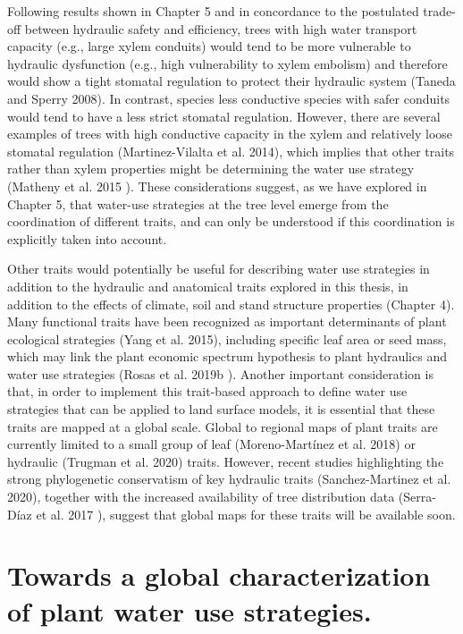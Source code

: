 \documentclass[11pt,twoside]{reedthesis}
\begin{document}
Following results shown in Chapter 5 and in concordance to the
postulated trade-off between hydraulic safety and efficiency, trees with
high water transport capacity (e.g., large xylem conduits) would tend to
be more vulnerable to hydraulic dysfunction (e.g., high vulnerability to
xylem embolism) and therefore would show a tight stomatal regulation to
protect their hydraulic system (Taneda and Sperry 2008). In contrast,
species less conductive species with safer conduits would tend to have a
less strict stomatal regulation. However, there are several examples of
trees with high conductive capacity in the xylem and relatively loose
stomatal regulation (Martinez-Vilalta et al. 2014), which implies that
other traits rather than xylem properties might be determining the water
use strategy (Matheny et al. 2015 ). These considerations suggest, as we
have explored in Chapter 5, that water-use strategies at the tree level
emerge from the coordination of different traits, and can only be
understood if this coordination is explicitly taken into account.\par

Other traits would potentially be useful for describing water use
strategies in addition to the hydraulic and anatomical traits explored
in this thesis, in addition to the effects of climate, soil and stand
structure properties (Chapter 4). Many functional traits have been
recognized as important determinants of plant ecological strategies
(Yang et al. 2015), including specific leaf area or seed mass, which may
link the plant economic spectrum hypothesis to plant hydraulics and
water use strategies (Rosas et al. 2019b ). Another important
consideration is that, in order to implement this trait-based approach
to define water use strategies that can be applied to land surface
models, it is essential that these traits are mapped at a global scale.
Global to regional maps of plant traits are currently limited to a small
group of leaf (Moreno-Martínez et al. 2018) or hydraulic (Trugman et al.
2020) traits. However, recent studies highlighting the strong
phylogenetic conservatism of key hydraulic traits (Sanchez-Martinez et
al. 2020), together with the increased availability of tree distribution
data (Serra-Díaz et al. 2017 ), suggest that global maps for these
traits will be available soon.\par

\section{Towards a global characterization of plant water use
strategies.}\label{towards-a-global-characterization-of-plant-water-use-strategies.}
\end{document}

